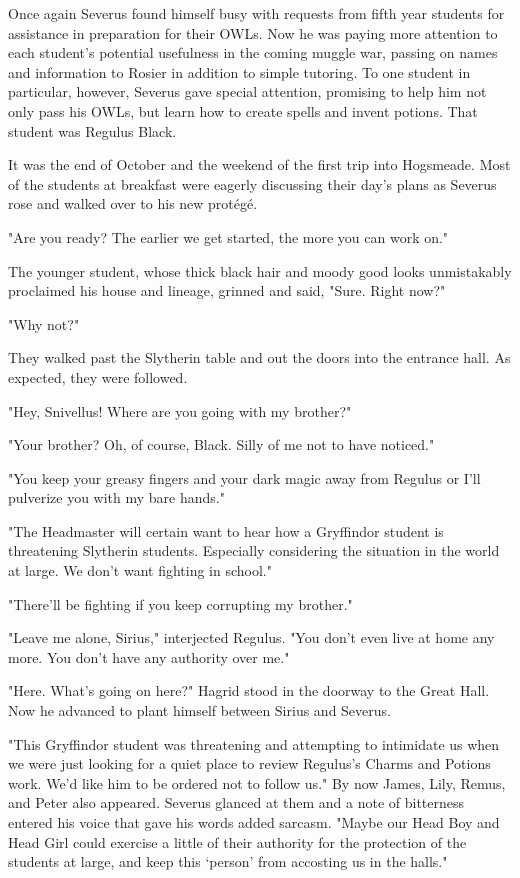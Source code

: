 Once again Severus found himself busy with requests from fifth year students for assistance in preparation for their OWLs. Now he was paying more attention to each student's potential usefulness in the coming muggle war, passing on names and information to Rosier in addition to simple tutoring. To one student in particular, however, Severus gave special attention, promising to help him not only pass his OWLs, but learn how to create spells and invent potions. That student was Regulus Black.

It was the end of October and the weekend of the first trip into Hogsmeade. Most of the students at breakfast were eagerly discussing their day's plans as Severus rose and walked over to his new protégé.

"Are you ready? The earlier we get started, the more you can work on."

The younger student, whose thick black hair and moody good looks unmistakably proclaimed his house and lineage, grinned and said, "Sure. Right now?"

"Why not?"

They walked past the Slytherin table and out the doors into the entrance hall. As expected, they were followed.

"Hey, Snivellus! Where are you going with my brother?"

"Your brother? Oh, of course, Black. Silly of me not to have noticed."

"You keep your greasy fingers and your dark magic away from Regulus or I'll pulverize you with my bare hands."

"The Headmaster will certain want to hear how a Gryffindor student is threatening Slytherin students. Especially considering the situation in the world at large. We don't want fighting in school."

"There'll be fighting if you keep corrupting my brother."

"Leave me alone, Sirius," interjected Regulus. "You don't even live at home any more. You don't have any authority over me."

"Here. What's going on here?" Hagrid stood in the doorway to the Great Hall. Now he advanced to plant himself between Sirius and Severus.

"This Gryffindor student was threatening and attempting to intimidate us when we were just looking for a quiet place to review Regulus's Charms and Potions work. We'd like him to be ordered not to follow us." By now James, Lily, Remus, and Peter also appeared. Severus glanced at them and a note of bitterness entered his voice that gave his words added sarcasm. "Maybe our Head Boy and Head Girl could exercise a little of their authority for the protection of the students at large, and keep this `person' from accosting us in the halls."

